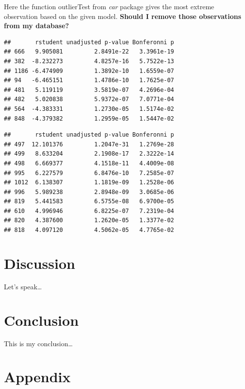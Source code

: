 \documentclass[12pt,]{article}
\begin{document}
Here the function outlierTest from \emph{car} package gives the most
extreme observation based on the given model. \textbf{Should I remove
those observations from my database?}

\begin{verbatim}
##       rstudent unadjusted p-value Bonferonni p
## 666   9.905081         2.8491e-22   3.3961e-19
## 382  -8.232273         4.8257e-16   5.7522e-13
## 1186 -6.474909         1.3892e-10   1.6559e-07
## 94   -6.465151         1.4786e-10   1.7625e-07
## 481   5.119119         3.5819e-07   4.2696e-04
## 482   5.020838         5.9372e-07   7.0771e-04
## 564  -4.383331         1.2730e-05   1.5174e-02
## 848  -4.379382         1.2959e-05   1.5447e-02
\end{verbatim}

\begin{verbatim}
##       rstudent unadjusted p-value Bonferonni p
## 497  12.101376         1.2047e-31   1.2769e-28
## 499   8.633204         2.1908e-17   2.3222e-14
## 498   6.669377         4.1518e-11   4.4009e-08
## 995   6.227579         6.8476e-10   7.2585e-07
## 1012  6.138307         1.1819e-09   1.2528e-06
## 996   5.989238         2.8948e-09   3.0685e-06
## 819   5.441583         6.5755e-08   6.9700e-05
## 610   4.996946         6.8225e-07   7.2319e-04
## 820   4.387600         1.2620e-05   1.3377e-02
## 818   4.097120         4.5062e-05   4.7765e-02
\end{verbatim}

\FloatBarrier
\newpage
{}

\section{Discussion}\label{discussion}

Let's speak\ldots{}

\FloatBarrier
\newpage
{}

\section*{Conclusion}\label{conclusion}

This is my conclusion\ldots{}

\newpage


\section*{Appendix}\label{appendix}
\end{document}
